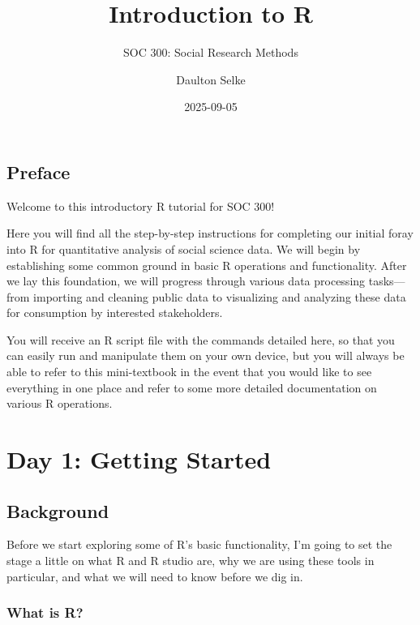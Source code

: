 \documentclass[
  letterpaper,
  DIV=11,
  numbers=noendperiod]{scrreprt}
\title{Introduction to R}
\subtitle{SOC 300: Social Research Methods}
\author{Daulton Selke}
\date{2025-09-05}
\renewcommand*\contentsname{Table of contents}
\newcommand\contentsname{Table of contents}
\begin{document}
\maketitle

\renewcommand*\contentsname{Table of contents}
{
\hypersetup{linkcolor=}
\setcounter{tocdepth}{2}
\tableofcontents
}


\chapter*{Preface}\label{preface}


Welcome to this introductory R tutorial for SOC 300!

Here you will find all the step-by-step instructions for completing our
initial foray into R for quantitative analysis of social science data.
We will begin by establishing some common ground in basic R operations
and functionality. After we lay this foundation, we will progress
through various data processing tasks---from importing and cleaning
public data to visualizing and analyzing these data for consumption by
interested stakeholders.

You will receive an R script file with the commands detailed here, so
that you can easily run and manipulate them on your own device, but you
will always be able to refer to this mini-textbook in the event that you
would like to see everything in one place and refer to some more
detailed documentation on various R operations.

\part{Day 1: Getting Started}

\chapter{Background}\label{background}

Before we start exploring some of R's basic functionality, I'm going to
set the stage a little on what R and R studio are, why we are using
these tools in particular, and what we will need to know before we dig
in.

\section{What is R?}\label{what-is-r}
\end{document}
